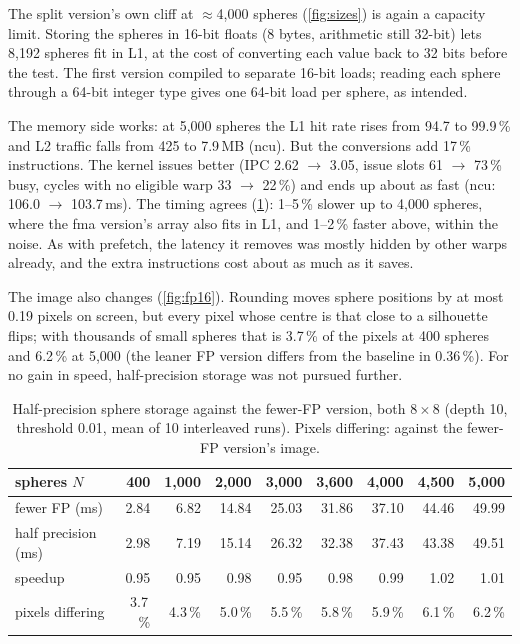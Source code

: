 \documentclass[11pt,a4paper]{article}
\begin{document}
The split version's own cliff at $\approx$4,000 spheres (\cref{fig:sizes}) is again a capacity
limit. Storing the spheres in 16-bit floats (8 bytes, arithmetic still 32-bit) lets 8,192 spheres fit in
L1, at the cost of converting each value back to 32 bits before the test. The first version compiled
to separate 16-bit loads; reading each sphere through a 64-bit integer type gives one 64-bit load per
sphere, as intended.

The memory side works: at 5,000 spheres the L1 hit rate rises from 94.7 to 99.9\,\% and L2 traffic
falls from 425 to 7.9\,MB (ncu). But the conversions add 17\,\% instructions. The kernel issues
better (IPC 2.62 $\to$ 3.05, issue slots 61 $\to$ 73\,\% busy, cycles with no eligible warp
33 $\to$ 22\,\%) and ends up about as fast (ncu: 106.0 $\to$ 103.7\,ms). The timing agrees
(\cref{tab:fp16}): 1--5\,\% slower up to 4,000 spheres, where the fma version's array also fits in
L1, and 1--2\,\% faster above, within the noise. As with prefetch, the latency it removes was mostly
hidden by other warps already, and the extra instructions cost about as much as it saves.

The image also changes (\cref{fig:fp16}). Rounding moves sphere positions by at most 0.19 pixels on
screen, but every pixel whose centre is that close to a silhouette flips; with thousands of small
spheres that is 3.7\,\% of the pixels at 400 spheres and 6.2\,\% at 5,000 (the leaner FP version
differs from the baseline in 0.36\,\%). For no gain in speed, half-precision storage was not
pursued further.

\begin{table}[h]
  \centering
  \small
  \begin{tabular}{@{}lrrrrrrrr@{}}
    \toprule
    spheres $N$ & 400 & 1,000 & 2,000 & 3,000 & 3,600 & 4,000 & 4,500 & 5,000 \\
    \midrule
    fewer FP (ms)        & 2.84 & 6.82 & 14.84 & 25.03 & 31.86 & 37.10 & 44.46 & 49.99 \\
    half precision (ms)  & 2.98 & 7.19 & 15.14 & 26.32 & 32.38 & 37.43 & 43.38 & 49.51 \\
    speedup              & 0.95 & 0.95 & 0.98 & 0.95 & 0.98 & 0.99 & 1.02 & 1.01 \\
    pixels differing     & 3.7\,\% & 4.3\,\% & 5.0\,\% & 5.5\,\% & 5.8\,\% & 5.9\,\% & 6.1\,\% & 6.2\,\% \\
    \bottomrule
  \end{tabular}
  \caption{Half-precision sphere storage against the fewer-FP version, both $8 \times 8$
    (depth 10, threshold 0.01, mean of 10 interleaved runs). Pixels differing: against the
    fewer-FP version's image.}
  \label{tab:fp16}
\end{table}
\end{document}
